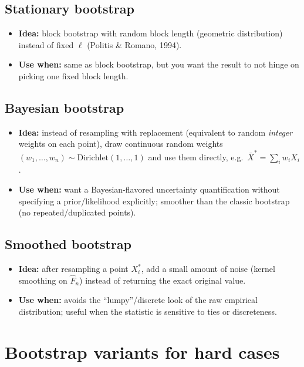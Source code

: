 \documentclass[11pt]{article}
\begin{document}
\subsection*{Stationary bootstrap}
\begin{itemize}
  \item \textbf{Idea:} block bootstrap with random block length (geometric distribution) instead of fixed $\ell$ (Politis \& Romano, 1994).
  \item \textbf{Use when:} same as block bootstrap, but you want the result to not hinge on picking one fixed block length.
\end{itemize}

\subsection*{Bayesian bootstrap}
\begin{itemize}
  \item \textbf{Idea:} instead of resampling with replacement (equivalent to random \emph{integer} weights on each point), draw continuous random weights $(w_1,\dots,w_n) \sim \mathrm{Dirichlet}(1,\dots,1)$ and use them directly, e.g.\ $\bar X^* = \sum_i w_i X_i$.
  \item \textbf{Use when:} want a Bayesian-flavored uncertainty quantification without specifying a prior/likelihood explicitly; smoother than the classic bootstrap (no repeated/duplicated points).
\end{itemize}

\subsection*{Smoothed bootstrap}
\begin{itemize}
  \item \textbf{Idea:} after resampling a point $X_i^*$, add a small amount of noise (kernel smoothing on $\widehat F_n$) instead of returning the exact original value.
  \item \textbf{Use when:} avoids the ``lumpy''/discrete look of the raw empirical distribution; useful when the statistic is sensitive to ties or discreteness.
\end{itemize}

\section{Bootstrap variants for hard cases}
\end{document}
